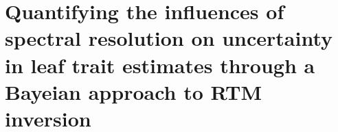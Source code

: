 \chapter{Quantifying the influences of spectral resolution on uncertainty in leaf trait estimates through a Bayeian approach to RTM inversion}\label{chapter:pecanrtm}
\thispagestyle{myheadings}






